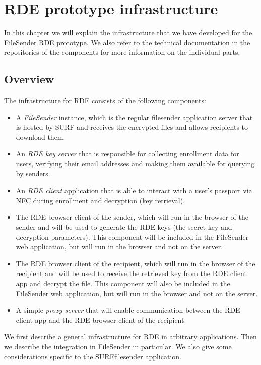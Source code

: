 \chapter{RDE prototype infrastructure}\label{ch:rde-prototype-infrastructure}
In this chapter we will explain the infrastructure that we have developed for the FileSender RDE prototype.
We also refer to the technical documentation in the repositories of the components for more information on the individual parts.

\section{Overview}\label{sec:rde-prototype-infrastructure-overview}
The infrastructure for RDE consists of the following components:
\begin{itemize}
    \item A \emph{FileSender} instance, which is the regular filesender application server that is hosted by SURF and receives the encrypted files and allows recipients to download them.
    \item An \emph{RDE key server} that is responsible for collecting enrollment data for users, verifying their email addresses and making them available for querying by senders.
    \item An \emph{RDE client} application that is able to interact with a user's passport via NFC during enrollment and decryption (key retrieval).
    \item The RDE browser client of the sender, which will run in the browser of the sender and will be used to generate the RDE keys (the secret key and decryption parameters).
    This component will be included in the FileSender web application, but will run in the browser and not on the server.
    \item The RDE browser client of the recipient, which will run in the browser of the recipient and will be used to receive the retrieved key from the RDE client app and decrypt the file.
    This component will also be included in the FileSender web application, but will run in the browser and not on the server.
    \item A simple \emph{proxy server} that will enable communication between the RDE client app and the RDE browser client of the recipient.
\end{itemize}

We first describe a general infrastructure for RDE in arbitrary applications.
Then we describe the integration in FileSender in particular.
We also give some considerations specific to the SURFfilesender application.

